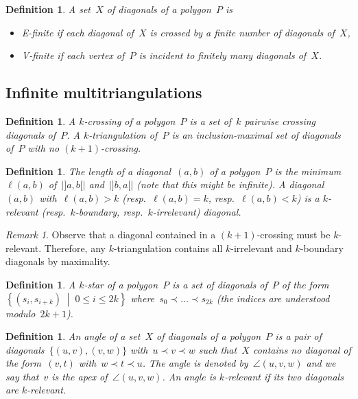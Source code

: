 \documentclass{amsart}
\newtheorem{definition}[theorem]{Definition}
\theoremstyle{remark}
\newtheorem{remark}{Remark}[section]
\newcommand{\darkblue}{\color{darkblue}} %
\newcommand{\defn}[1]{\textsl{\darkblue #1}} %
\newcommand{\set}[2]{\left\{ #1 \;\middle|\; #2 \right\}} %
\newcommand*{\ef}[0]{E-finite\xspace}
\newcommand*{\vf}[0]{V-finite\xspace}
\newcommand*{\ktg}[0]{$k$-triangulation\xspace}
\newcommand{\cl}{\prec}
\begin{document}
\begin{definition}
\label{def:EV-finite}
A set~$X$ of diagonals of a polygon~$P$ is 
\begin{itemize}
\item \defn{\ef} if each diagonal of~$X$ is crossed by a finite number of diagonals of~$X$,
\item \defn{\vf} if each vertex of~$P$ is incident to finitely many diagonals of~$X$.
\end{itemize}
\end{definition}


\subsection{Infinite multitriangulations}

\begin{definition}
A \defn{$k$-crossing} of a polygon~$P$ is a set of~$k$ pairwise crossing diagonals of~$P$.
A \defn{$k$-triangulation} of~$P$ is an inclusion-maximal set of diagonals of~$P$ with no $(k+1)$-crossing.
\end{definition}

\begin{definition}
The \defn{length} of a diagonal~$(a,b)$ of a polygon~$P$ is the minimum~$\ell(a,b)$ of~$|{]a,b[}|$ and~$|{]b,a[}|$ (note that this might be infinite).
A diagonal~$(a,b)$ with~$\ell(a,b) > k$ (resp.~$\ell(a,b) = k$, resp.~$\ell(a,b) < k$) is a \defn{$k$-relevant} (resp.~\defn{$k$-boundary}, resp.~\defn{$k$-irrelevant}) diagonal.
\end{definition}

\begin{remark}
Observe that a diagonal contained in a $(k+1)$-crossing must be $k$-relevant.
Therefore, any \ktg contains all $k$-irrelevant and $k$-boundary diagonals by maximality.
\end{remark}


\begin{definition}
A \defn{$k$-star} of a polygon~$P$ is a set of diagonals of~$P$ of the form~$\set{(s_i, s_{i+k})}{0 \le i \le 2k}$ where~$s_0 \cl \dots \cl s_{2k}$ (the indices are understood modulo~$2k+1$).
\end{definition}

\begin{definition}
An \defn{angle} of a set~$X$ of diagonals of a polygon~$P$ is a pair of diagonals~$\{(u,v), (v,w)\}$ with~$u \cl v \cl w$ such that~$X$ contains no diagonal of the form~$(v,t)$ with~$w \cl t \cl u$. The angle is denoted by~$\angle(u,v,w)$ and we say that~$v$ is the \defn{apex} of~$\angle(u,v,w)$. An angle is \defn{$k$-relevant} if its two diagonals are $k$-relevant. %
\end{definition}
\end{document}
